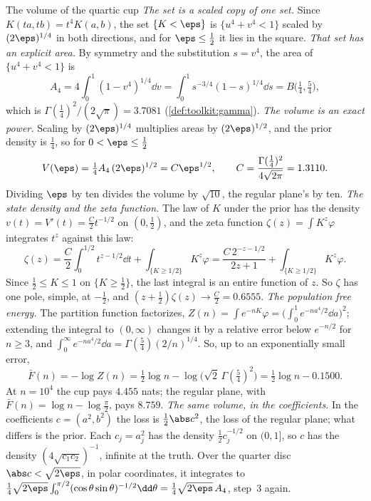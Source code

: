 \begin{refsection}
\begin{computation}{The volume of the quartic cup}\label{comp:volume:cup}
\step \emph{The set is a scaled copy of one set.} Since $K(ta,tb)=t^4K(a,b)$, the set $\{K<\eps\}$ is $\{u^4+v^4<1\}$ scaled by $(2\eps)^{1/4}$ in both directions, and for $\eps\le\frac12$ it lies in the square.
\step \emph{That set has an explicit area.} By symmetry and the substitution $s=v^4$, the area of $\{u^4+v^4<1\}$ is
\[
A_4=4\int_0^1(1-v^4)^{1/4}\dd v=\int_0^1s^{-3/4}(1-s)^{1/4}\dd s=B\bigl(\tfrac14,\tfrac54\bigr),
\]
which is $\Gamma(\frac14)^2/(2\sqrt\pi)=3.7081$ (\cref{def:toolkit:gamma}).
\step \emph{The volume is an exact power.} Scaling by $(2\eps)^{1/4}$ multiplies areas by $(2\eps)^{1/2}$, and the prior density is $\frac14$, so for $0<\eps\le\frac12$
\[
V(\eps)=\tfrac14A_4\,(2\eps)^{1/2}=C\eps^{1/2},\qquad C=\frac{\Gamma(\frac14)^2}{4\sqrt{2\pi}}=1.3110 .
\]
Dividing $\eps$ by ten divides the volume by $\sqrt{10}$, the regular plane's by ten.
\step \emph{The state density and the zeta function.} The law of $K$ under the prior has the density $v(t)=V'(t)=\frac C2t^{-1/2}$ on $(0,\frac12)$, and the zeta function $\zeta(z)=\int K^z\varphi$ integrates $t^z$ against this law:
\[
\zeta(z)=\frac C2\int_0^{1/2}t^{z-1/2}\dd t+\int_{\{K\ge1/2\}}K^z\varphi=\frac{C\,2^{-z-1/2}}{2z+1}+\int_{\{K\ge1/2\}}K^z\varphi .
\]
Since $\frac12\le K\le1$ on $\{K\ge\frac12\}$, the last integral is an entire function of $z$. So $\zeta$ has one pole, simple, at $-\frac12$, and $(z+\frac12)\zeta(z)\to\frac C2=0.6555$.
\step \emph{The population free energy.} The partition function factorizes, $Z(n)=\int e^{-nK}\varphi=\bigl(\int_0^1e^{-na^4/2}\dd a\bigr)^2$; extending the integral to $(0,\infty)$ changes it by a relative error below $e^{-n/2}$ for $n\ge3$, and $\int_0^\infty e^{-na^4/2}\dd a=\Gamma(\frac54)(2/n)^{1/4}$. So, up to an exponentially small error,
\[
\bar F(n)=-\log Z(n)=\tfrac12\log n-\log\bigl(\sqrt2\,\Gamma(\tfrac54)^2\bigr)=\tfrac12\log n-0.1500 .
\]
At $n=10^4$ the cup pays $4.455$ nats; the regular plane, with $\bar F(n)=\log n-\log\frac\pi2$, pays $8.759$.
\step \emph{The same volume, in the coefficients.} In the coefficients $c=(a^2,b^2)$ the loss is $\frac12\abs c^2$, the loss of the regular plane; what differs is the prior. Each $c_j=a_j^2$ has the density $\frac12c_j^{-1/2}$ on $(0,1]$, so $c$ has the density $(4\sqrt{c_1c_2})^{-1}$, infinite at the truth. Over the quarter disc $\abs c<\sqrt{2\eps}$, in polar coordinates, it integrates to $\frac14\sqrt{2\eps}\int_0^{\pi/2}(\cos\theta\sin\theta)^{-1/2}\dd\theta=\frac14\sqrt{2\eps}\,A_4$, step~3 again.
\end{computation}


\end{refsection}
